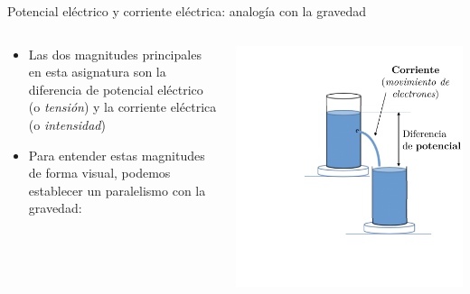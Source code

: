 \documentclass[aspectratio=169, xcolor={usenames,svgnames,dvipsnames}]{beamer}
\begin{document}
\begin{frame}{Potencial eléctrico y corriente eléctrica: \hspace{5mm}analogía con la gravedad}
    \begin{columns}
    \begin{column}{0.5\columnwidth}

        \vspace{-25mm}
        
        \begin{itemize}
         \item Las dos magnitudes principales en esta asignatura son la diferencia de \alert{potencial eléctrico} (o \textit{tensión}) y la \alert{corriente eléctrica} (o \textit{intensidad})

        \vspace{5mm}
        
        \item Para entender estas magnitudes de forma visual, podemos establecer un \alert{paralelismo con la gravedad}:
        \end{itemize}
    \end{column}  
    \begin{column}{0.5\columnwidth}
        \vspace{5mm}
        
        \includegraphics[height=0.9\textheight]{../figs/analogia_gravedad1.pdf}
    \end{column}
    \end{columns}
\end{frame}
\end{document}
